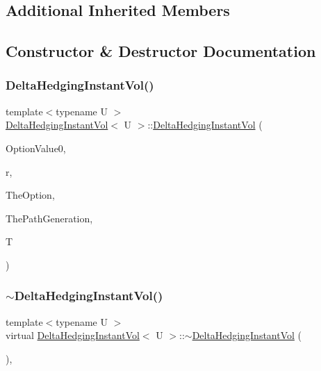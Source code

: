 \subsection*{Additional Inherited Members}


\subsection{Constructor \& Destructor Documentation}
\hypertarget{classDeltaHedgingInstantVol_a64229bc4a65fa32959d22bc449ad0520}{}\label{classDeltaHedgingInstantVol_a64229bc4a65fa32959d22bc449ad0520} 
\subsubsection{\texorpdfstring{Delta\+Hedging\+Instant\+Vol()}{DeltaHedgingInstantVol()}}
{\footnotesize\ttfamily template$<$typename U $>$ \\
\hyperlink{classDeltaHedgingInstantVol}{Delta\+Hedging\+Instant\+Vol}$<$ U $>$\+::\hyperlink{classDeltaHedgingInstantVol}{Delta\+Hedging\+Instant\+Vol} (\begin{DoxyParamCaption}\item[{double}]{Option\+Value0,  }\item[{double}]{r,  }\item[{shared\+\_\+ptr$<$ U $>$}]{The\+Option,  }\item[{shared\+\_\+ptr$<$ \hyperlink{classPathGenerationHeston}{Path\+Generation\+Heston} $>$}]{The\+Path\+Generation,  }\item[{double}]{T }\end{DoxyParamCaption})}

\hypertarget{classDeltaHedgingInstantVol_a87a3e73ee61d8dc3d9d04120f9f323a3}{}\label{classDeltaHedgingInstantVol_a87a3e73ee61d8dc3d9d04120f9f323a3} 
\subsubsection{\texorpdfstring{$\sim$\+Delta\+Hedging\+Instant\+Vol()}{~DeltaHedgingInstantVol()}}
{\footnotesize\ttfamily template$<$typename U $>$ \\
virtual \hyperlink{classDeltaHedgingInstantVol}{Delta\+Hedging\+Instant\+Vol}$<$ U $>$\+::$\sim$\hyperlink{classDeltaHedgingInstantVol}{Delta\+Hedging\+Instant\+Vol} (\begin{DoxyParamCaption}{ }\end{DoxyParamCaption})\hspace{0.3cm}{\ttfamily [inline]}, {\ttfamily [virtual]}}



